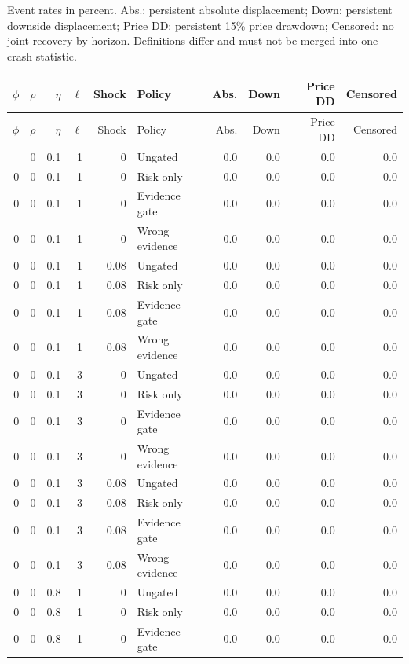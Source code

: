 Event rates in percent. Abs.: persistent absolute displacement; Down: persistent downside displacement; Price DD: persistent 15\% price drawdown; Censored: no joint recovery by horizon. Definitions differ and must not be merged into one crash statistic.
\begingroup\footnotesize\setlength{\tabcolsep}{4pt}
\begin{longtable}{rrrrrlrrrr}\toprule
$\phi$ & $\rho$ & $\eta$ & $\ell$ & Shock & Policy & Abs. & Down & Price DD & Censored\\\midrule\endfirsthead
\toprule $\phi$ & $\rho$ & $\eta$ & $\ell$ & Shock & Policy & Abs. & Down & Price DD & Censored\\\midrule\endhead
\bottomrule\endfoot
0 & 0 & 0.1 & 1 & 0 & Ungated & 0.0 & 0.0 & 0.0 & 0.0\\
0 & 0 & 0.1 & 1 & 0 & Risk only & 0.0 & 0.0 & 0.0 & 0.0\\
0 & 0 & 0.1 & 1 & 0 & Evidence gate & 0.0 & 0.0 & 0.0 & 0.0\\
0 & 0 & 0.1 & 1 & 0 & Wrong evidence & 0.0 & 0.0 & 0.0 & 0.0\\
0 & 0 & 0.1 & 1 & 0.08 & Ungated & 0.0 & 0.0 & 0.0 & 0.0\\
0 & 0 & 0.1 & 1 & 0.08 & Risk only & 0.0 & 0.0 & 0.0 & 0.0\\
0 & 0 & 0.1 & 1 & 0.08 & Evidence gate & 0.0 & 0.0 & 0.0 & 0.0\\
0 & 0 & 0.1 & 1 & 0.08 & Wrong evidence & 0.0 & 0.0 & 0.0 & 0.0\\
0 & 0 & 0.1 & 3 & 0 & Ungated & 0.0 & 0.0 & 0.0 & 0.0\\
0 & 0 & 0.1 & 3 & 0 & Risk only & 0.0 & 0.0 & 0.0 & 0.0\\
0 & 0 & 0.1 & 3 & 0 & Evidence gate & 0.0 & 0.0 & 0.0 & 0.0\\
0 & 0 & 0.1 & 3 & 0 & Wrong evidence & 0.0 & 0.0 & 0.0 & 0.0\\
0 & 0 & 0.1 & 3 & 0.08 & Ungated & 0.0 & 0.0 & 0.0 & 0.0\\
0 & 0 & 0.1 & 3 & 0.08 & Risk only & 0.0 & 0.0 & 0.0 & 0.0\\
0 & 0 & 0.1 & 3 & 0.08 & Evidence gate & 0.0 & 0.0 & 0.0 & 0.0\\
0 & 0 & 0.1 & 3 & 0.08 & Wrong evidence & 0.0 & 0.0 & 0.0 & 0.0\\
0 & 0 & 0.8 & 1 & 0 & Ungated & 0.0 & 0.0 & 0.0 & 0.0\\
0 & 0 & 0.8 & 1 & 0 & Risk only & 0.0 & 0.0 & 0.0 & 0.0\\
0 & 0 & 0.8 & 1 & 0 & Evidence gate & 0.0 & 0.0 & 0.0 & 0.0\\

\end{longtable}
